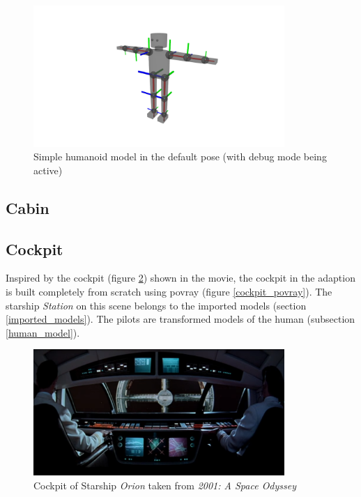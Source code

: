 \begin{figure}[ht]
	\centering
	\includegraphics[width=0.85\textwidth]{images/human.png}
	\caption{Simple humanoid model in the default pose (with debug mode being active)}
	\label{fig_human}
\end{figure}

\subsection{Cabin}

\subsection{Cockpit} \label{cockpit_model}
Inspired by the cockpit (figure \ref{cockpit_original}) shown in the movie, the cockpit in the adaption  is built completely from scratch using povray (figure \ref{cockpit_povray}). The starship \textit{Station} on this scene belongs to the imported models (section \ref{imported_models}).
The pilots are transformed models of the human (subsection \ref{human_model}).

\begin{figure}[ht]
	\centering
	\includegraphics[width=0.85\textwidth]{images/original_cockpit.png}
	\caption{Cockpit of Starship \textit{Orion} taken from \textit{2001: A Space Odyssey}}
	\label{cockpit_original}
\end{figure}

